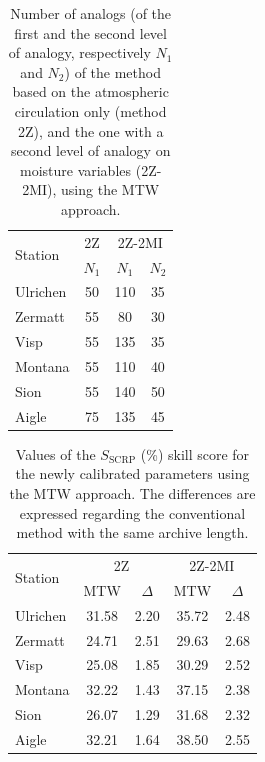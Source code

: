 \documentclass[hess, manuscript]{copernicus}
\begin{document}
\begin{table}[htb]
	\caption{Number of analogs (of the first and the second level of analogy, respectively $N_{1}$ and $N_{2}$) of the method based on the atmospheric circulation only (method 2Z), and the one with a second level of analogy on moisture variables (2Z-2MI), using the MTW approach.}
	\begin{center}
		\begin{tabular}{l c c c }
			\hline
			\multirow{2}{*}{Station} & \multicolumn{1}{c}{2Z} & \multicolumn{2}{c}{2Z-2MI} \\
			& $N_{1}$ & $N_{1}$ & $N_{2}$ \\ 
			\hline
			Ulrichen & 50 & 110 & 35 \\
			Zermatt & 55 & 80 & 30 \\
			Visp & 55 & 135 & 35 \\
			Montana & 55 & 110 & 40 \\
			Sion & 55 & 140 & 50 \\
			Aigle & 75 & 135 & 45 \\ 
			\hline
		\end{tabular}
	\end{center}	
	\label{table:nb_analogs_new}
\end{table}

\begin{table}[htb]
	\caption{Values of the $S_{\text{SCRP}}$ (\%) skill score for the newly calibrated parameters using the MTW approach. The differences are expressed regarding the conventional method with the same archive length.}
	\begin{center}
		\begin{tabular}{l c c c c}
			\hline
			\multirow{2}{*}{Station} & \multicolumn{2}{c}{2Z} & \multicolumn{ 2}{c}{2Z-2MI} \\
			& MTW & $\Delta$ & MTW & $\Delta$ \\
			\hline
			Ulrichen & 31.58 & 2.20 & 35.72 & 2.48  \\
			Zermatt & 24.71 & 2.51 & 29.63 & 2.68 \\
			Visp & 25.08 & 1.85 & 30.29 & 2.52 \\
			Montana & 32.22 & 1.43 & 37.15 & 2.38 \\
			Sion & 26.07 & 1.29 & 31.68 & 2.32 \\
			Aigle & 32.21 & 1.64 & 38.50 & 2.55 \\
			\hline
		\end{tabular}
	\end{center}
	\label{table:CRPSS_recalibration}
\end{table}
\end{document}
